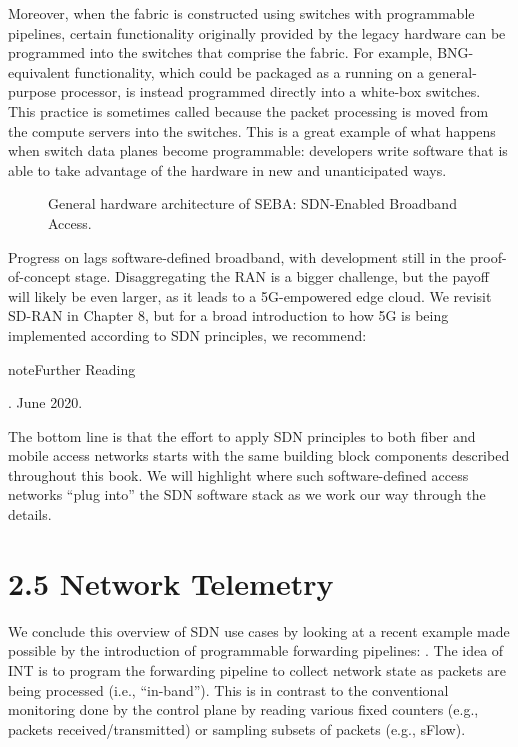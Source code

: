 \documentclass[letterpaper,11pt,english]{sphinxmanual}
\let\sphinxpxdimen\pdfpxdimen\else\newdimen\sphinxpxdimen
\begin{document}
Moreover, when the fabric is constructed using switches with
programmable pipelines, certain functionality originally provided by
the legacy hardware can be programmed into the switches that comprise
the fabric. For example, BNG-equivalent functionality, which could be
packaged as a  running on a
general-purpose processor, is instead programmed directly into a
white-box switches. This practice is sometimes called  because the packet processing is moved from the compute
servers into the switches. This is a great example of what happens
when switch data planes become programmable: developers write software
that is able to take advantage of the hardware in new and unanticipated
ways.

\begin{figure}[htbp]
\centering
\capstart

\noindent\sphinxincludegraphics[width=500\sphinxpxdimen]{{Slide21}.png}
\caption{General hardware architecture of SEBA: SDN-Enabled Broadband
Access.}\label{\detokenize{uses:id4}}\label{\detokenize{uses:fig-seba}}\end{figure}

Progress on  lags
software-defined broadband, with development still in the
proof-of-concept stage. Disaggregating the RAN is a bigger challenge,
but the payoff will likely be even larger, as it leads to a
5G-empowered edge cloud. We revisit SD-RAN in Chapter 8, but for a
broad introduction to how 5G is being implemented according to SDN
principles, we recommend:

\label{\detokenize{uses:reading-5g}}
\begin{sphinxadmonition}{note}{Further Reading}

. June 2020.
\end{sphinxadmonition}

The bottom line is that the effort to apply SDN principles to both
fiber and mobile access networks starts with the same building block
components described throughout this book. We will highlight where
such software-defined access networks “plug into” the SDN software
stack as we work our way through the details.


\section{2.5 Network Telemetry}
\label{\detokenize{uses:network-telemetry}}
We conclude this overview of SDN use cases by looking at a recent
example made possible by the introduction of programmable forwarding
pipelines: . The idea of INT is to
program the forwarding pipeline to collect network state as packets
are being processed (i.e., “in-band”). This is in contrast to the
conventional monitoring done by the control plane by reading various
fixed counters (e.g., packets received/transmitted) or sampling
subsets of packets (e.g., sFlow).
\end{document}
